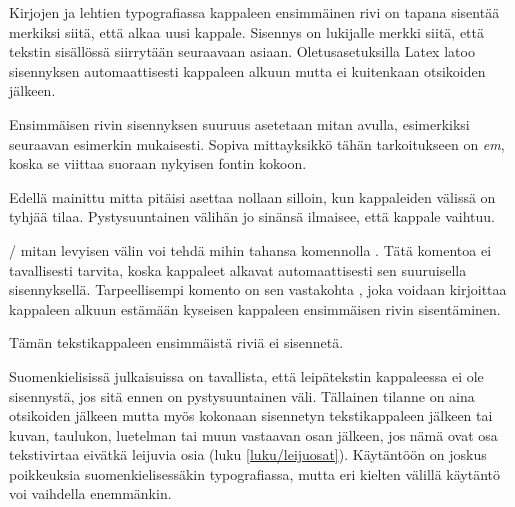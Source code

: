 Kirjojen ja lehtien typografiassa kappaleen ensimmäinen rivi on tapana
sisentää merkiksi siitä, että alkaa uusi kappale. Sisennys on lukijalle
merkki siitä, että tekstin sisällössä siirrytään seuraavaan asiaan.
Oletusasetuksilla Latex latoo sisennyksen automaattisesti kappaleen
alkuun mutta ei kuitenkaan otsikoiden jälkeen.

Ensimmäisen rivin sisennyksen suuruus asetetaan mitan 
avulla, esimerkiksi seuraavan esimerkin mukaisesti. Sopiva mittayksikkö
tähän tarkoitukseen on \emph{em}, koska se viittaa suoraan nykyisen
fontin kokoon.

\begin{koodilohkosis}
\setlength{\parindent}{1em}
\end{koodilohkosis}

\noindent
Edellä mainittu mitta pitäisi asettaa nollaan silloin, kun kappaleiden
välissä on tyhjää tilaa. Pystysuuntainen välihän jo sinänsä ilmaisee,
että kappale vaihtuu.

\begin{koodilohkosis}
\setlength{\parskip}{1.3ex plus .2ex minus .1ex}
\setlength{\parindent}{0em}  %
\end{koodilohkosis}

\noindent
{}\-/ mitan levyisen välin voi tehdä mihin tahansa
komennolla . Tätä komentoa ei tavallisesti tarvita,
koska kappaleet alkavat automaattisesti sen suuruisella sisennyksellä.
Tarpeellisempi komento on sen vastakohta , joka
voidaan kirjoittaa kappaleen alkuun estämään kyseisen kappaleen
ensimmäisen rivin sisentäminen.

\begin{koodilohkosis}
\noindent
Tämän tekstikappaleen ensimmäistä riviä ei sisennetä.
\end{koodilohkosis}

\noindent
Suomenkielisissä julkaisuissa on tavallista, että leipätekstin
kappaleessa ei ole sisennystä, jos sitä ennen on pystysuuntainen väli.
Tällainen tilanne on aina otsikoiden jälkeen mutta myös kokonaan
sisennetyn tekstikappaleen jälkeen tai kuvan, taulukon, luetelman tai
muun vastaavan osan jälkeen, jos nämä ovat osa tekstivirtaa eivätkä
leijuvia osia (luku \ref{luku/leijuosat}). Käytäntöön on joskus
poikkeuksia suomenkielisessäkin typografiassa, mutta eri kielten välillä
käytäntö voi vaihdella enemmänkin.

